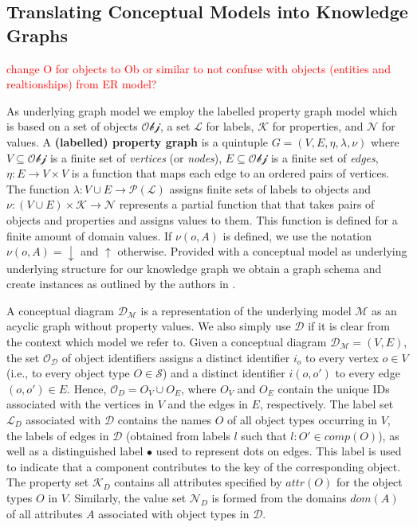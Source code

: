 \documentclass[sigconf]{acmart}
\begin{document}
\subsection{Translating Conceptual Models into Knowledge Graphs}


\textcolor{red}{change O for objects to Ob or similar to not confuse with objects (entities and realtionships) from ER model?}


As underlying graph model we employ the labelled property graph model which is based on a set of objects $\mathcal{Obj}$, a set $\mathcal{L}$ for labels, $\mathcal{K}$ for properties, and $\mathcal{N}$ for values.  A \textbf{(labelled) property graph} is a quintuple $G=(V, E, \eta, \lambda,  \nu)$ where $V \subseteq\mathcal{Obj}$ is a finite set of \emph{vertices} (or \emph{nodes}), $E \subseteq\mathcal{Obj}$ is a finite set of \emph{edges}, $\eta: E\rightarrow V\times V$ is a function that maps each edge to an ordered pairs of vertices. The function $\lambda:V\cup E\rightarrow\mathcal{P}(\mathcal{L})$ assigns finite sets of labels to objects and $\nu: (V\cup E)\times\mathcal{K}\rightarrow\mathcal{N}$ represents a partial function that that takes pairs of objects and properties and assigns values to them. This function is defined for a finite amount of domain values. If $\nu(o,A)$ is defined, we use the notation $\nu(o,A)=\downarrow$ and $\uparrow$ otherwise. Provided with a conceptual model as underlying underlying structure for our knowledge graph we obtain a graph schema and create instances as outlined by the authors in \cite{Skavantzos_25_ER_Graphs}.

A conceptual diagram $\mathcal{D_M}$ is a representation of the underlying model $\mathcal{M}$ as an acyclic graph without property values. We also simply use $\mathcal{D}$ if it is clear from the context which model we refer to. Given a conceptual diagram $\mathcal{D_M}=(V,E)$, the set $\mathcal{O_D}$ of object identifiers assigns a distinct identifier $i_o$ to every vertex $o\in V$ (i.e., to every object type $O\in\mathcal{S}$) and a distinct identifier $i{(o,o')}$ to every edge $(o,o')\in E$. Hence, $\mathcal{O}_D=O_V\cup O_E$, where $O_V$ and $O_E$ contain the unique IDs associated with the vertices in $V$ and the edges in $E$, respectively.
The label set $\mathcal{L}_D$ associated with $\mathcal{D}$ contains the names $O$ of all object types occurring in $V$, the labels of edges in $\mathcal{D}$ (obtained from labels $l$ such that $l:O'\in\textit{comp}(O)$), as well as a distinguished label $\bullet$ used to represent dots on edges. This label is used to indicate that a component contributes to the key of the corresponding object. The property set $\mathcal{K}_D$ contains all attributes specified by $\textit{attr}(O)$ for the object types $O$ in $V$. Similarly, the value set $\mathcal{N}_D$ is formed from the domains $\textit{dom}(A)$ of all attributes $A$ associated with object types in $\mathcal{D}$.
\end{document}

